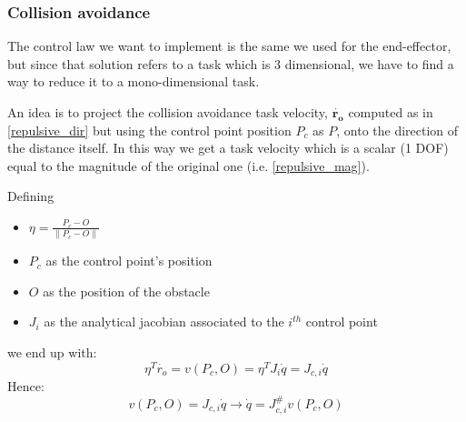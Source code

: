 \documentclass[12pt, a4paper]{article}
\newcommand{\norm}[1]{\parallel{#1}\parallel}
\begin{document}
\subsubsection{Collision avoidance}

The control law we want to implement is the same we used for the end-effector, but since that solution refers to a task which is 3 dimensional, we have to find a way to reduce it to a mono-dimensional task.

An idea is to project the collision avoidance task velocity, $\mathbf{\dot{r_{o}}}$ computed as in \eqref{repulsive_dir} but using the control point position $P_c$ as $P$, onto the direction of the distance itself. In this way we get a task velocity which is a scalar (1 DOF) equal to the magnitude of the original one (i.e. \eqref{repulsive_mag}).

Defining 
\begin{itemize}
	\item $\eta = \frac{P_c - O}{\norm{P_c-O}}$
	\item $P_c$ as the control point's position
	\item $O$ as the position of the obstacle
	\item $J_i$ as the analytical jacobian associated to the $i^{th}$ control point
\end{itemize}
we end up with:
\begin{equation*}
\eta^T\dot{r_{o}} = v(P_c,O) =\eta^T J_i\dot{q} = J_{c,i}\dot{q}
\end{equation*}
Hence:
\begin{equation}
v(P_c,O) = J_{c,i}\dot{q} \rightarrow \dot{q} = J_{c,i}^{\#}v(P_c,O)
\end{equation}

\end{document}
